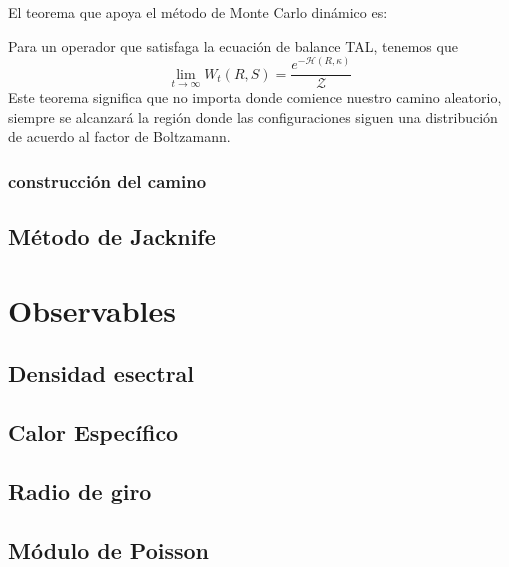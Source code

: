 El teorema que apoya el método de Monte Carlo dinámico es:

Para un operador que satisfaga la ecuación de balance TAL, tenemos que
\begin{equation}
\lim_{t\rightarrow \infty}W_t(R,S)=\frac{e^{-\mathcal{H}(R,\kappa)}}{\mathcal{Z}}
\end{equation}
Este teorema significa que no importa donde comience nuestro camino aleatorio,
siempre se alcanzará la región donde las configuraciones siguen una
distribución  de acuerdo al factor de Boltzamann. 

\subsubsection{construcción del camino}
\subsection{Método de Jacknife}

\section{Observables}

\subsection{Densidad esectral}
\subsection{Calor Específico}
\subsection{Radio de giro}
\subsection{Módulo de Poisson}

